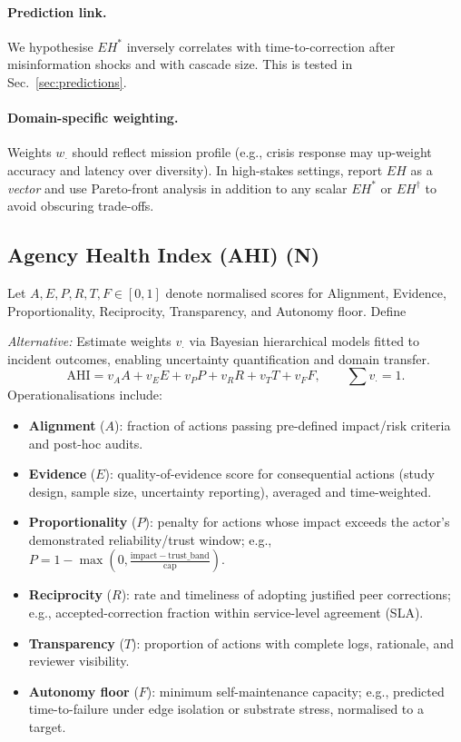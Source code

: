 \documentclass[12pt]{article}
\begin{document}
\paragraph{Prediction link.} We hypothesise $EH^{\ast}$ inversely correlates with time-to-correction after misinformation shocks and with cascade size. This is tested in Sec.~\ref{sec:predictions}.

\paragraph{Domain-specific weighting.} Weights $w_{\cdot}$ should reflect mission profile (e.g., crisis response may up-weight accuracy and latency over diversity). In high-stakes settings, report $EH$ as a \emph{vector} and use Pareto-front analysis in addition to any scalar $EH^{\ast}$ or $EH^{\dagger}$ to avoid obscuring trade-offs.
\subsection{Agency Health Index (AHI) (N)} Let $A,E,P,R,T,F\in[0,1]$ denote normalised scores for Alignment, Evidence, Proportionality, Reciprocity, Transparency, and Autonomy floor. Define

\emph{Alternative:} Estimate weights $v_{\cdot}$ via Bayesian hierarchical models fitted to incident outcomes, enabling uncertainty quantification and domain transfer.
\begin{equation}
\mathrm{AHI}=v_A A+v_E E+v_P P+v_R R+v_T T+v_F F,\qquad \sum v_{\cdot}=1.
\end{equation} Operationalisations include:

\begin{itemize}[leftmargin=1.2em]
\item \textbf{Alignment} ($A$): fraction of actions passing pre-defined impact/risk criteria and post-hoc audits.
\item \textbf{Evidence} ($E$): quality-of-evidence score for consequential actions (study design, sample size, uncertainty reporting), averaged and time-weighted.
\item \textbf{Proportionality} ($P$): penalty for actions whose impact exceeds the actor's demonstrated reliability/trust window; e.g., $P=1-\max(0,\frac{\mathrm{impact}-\mathrm{trust\_band}}{\mathrm{cap}})$.
\item \textbf{Reciprocity} ($R$): rate and timeliness of adopting justified peer corrections; e.g., accepted-correction fraction within service-level agreement (SLA).
\item \textbf{Transparency} ($T$): proportion of actions with complete logs, rationale, and reviewer visibility.
\item \textbf{Autonomy floor} ($F$): minimum self-maintenance capacity; e.g., predicted time-to-failure under edge isolation or substrate stress, normalised to a target.
\end{itemize}
\end{document}
